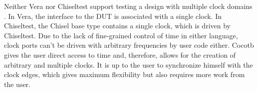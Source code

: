 Neither Vera nor Chiseltest support testing a design with multiple clock domains \cite[Sec.
7]{flake2020a}\cite{chiseltest_multiclock}. In Vera, the interface to the DUT is associated with a single clock. In
Chiseltest, the Chisel  base type contains a single clock, which is driven by Chiseltest. Due to the lack of
fine-grained control of time in either language, clock ports can't be driven with arbitrary frequencies by user code either. Cocotb gives the user direct access to time and, therefore, allows for the creation of arbitrary and multiple clocks. It is up to the user to synchronize himself with the clock edges, which gives maximum flexibility but also requires more work from the user. 

